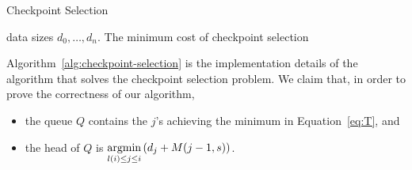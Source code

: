 \begin{algorithm}[h!tb]
\begin{algorithmic}
\caption{Checkpoint Selection}
\label{alg:checkpoint-selection}
\Require data sizes $d_0, \ldots, d_n$.
\Ensure The minimum cost of checkpoint selection
    \EndFor
\EndFor
{} 
\end{algorithmic}
\end{algorithm}

Algorithm~\ref{alg:checkpoint-selection} is the implementation details of the algorithm that solves the checkpoint selection problem.
We claim that, in order to prove the correctness of our algorithm,
\begin{itemize}
    \item the queue $Q$ contains the $j$'s achieving the minimum in Equation~\ref{eq:T}, and
    \item the head of $Q$ is $\displaystyle\operatorname*{argmin}_{l(i)\leq j\leq i}\,(d_j + M(j - 1, s))$.
\end{itemize}

